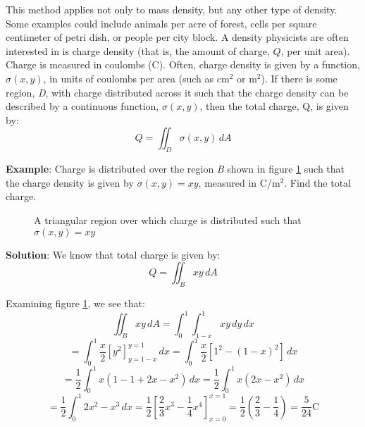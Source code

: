 This method applies not only to mass density, but any other type of density. 
Some examples could include animals per acre of forest, cells per square 
centimeter of petri dish, or people per city block. A density physicists are 
often interested in is charge density (that is, the amount of charge, $Q$, per 
unit area). Charge is measured in coulombs (C). Often, charge density is given 
by a function, $\sigma (x, y)$, in units of coulombs per area (such as 
$\text{cm}^2$ or $\text{m}^2$). If there is some region, \textit{D}, with 
charge distributed across it such that the charge density can be described 
by a continuous function, $\sigma (x, y)$, then the total charge, Q, is given 
by:
$$Q = \iint_{\textit{D}} \sigma (x, y)\,dA$$

\textbf{Example}: Charge is distributed over the region \textit{B} shown in 
figure \ref{fig:charge} such that the charge density is given by $\sigma (x, y)
= xy$, measured in C/$\text{m}^2$. Find the total charge. 

\begin{figure}[htbp]
\centering
    \caption{A triangular region over which charge is distributed such that 
    $\sigma (x, y) = xy$}
    \label{fig:charge}
\end{figure}

\textbf{Solution}: We know that total charge is given by:
$$Q = \iint_{\textit{B}} xy\,dA$$ 

Examining figure \ref{fig:charge}, we see that:
$$\iint_{\textit{B}} xy\,dA = \int_0^1 \int_{1 - x}^1 xy\,dy\,dx$$
$$= \int_0^1 \frac{x}{2} \left[ y^2 \right]_{y = 1 - x}^{y = 1}\,dx = \int_0^1 
\frac{x}{2} \left[ 1^2 - \left( 1 - x \right)^2 \right]\,dx$$
$$= \frac{1}{2} \int_0^1 x \left(1 - 1 + 2x - x^2 \right)\,dx = \frac{1}{2} 
\int_0^1 x \left(2x - x^2 \right)\,dx$$
$$= \frac{1}{2} \int_0^1 2x^2 - x^3\,dx = \frac{1}{2} \left[ \frac{2}{3}x^3 - 
\frac{1}{4}x^4 \right]_{x = 0}^{x = 1} = \frac{1}{2} \left( \frac{2}{3} - 
\frac{1}{4} \right) = \frac{5}{24} \text{C}$$


